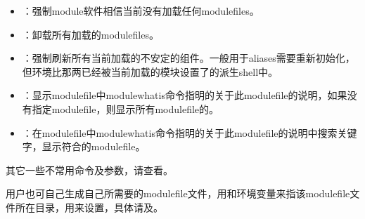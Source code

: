 \documentclass[a4paper,12pt,english]{sphinxmanual}
\begin{document}
\begin{itemize}
\begin{itemize}
\item {} 
\sphinxAtStartPar
prepend\sphinxhyphen{}path：表示将对应目录加到对应环境变量的前面。

\end{itemize}

\item {} 
\sphinxAtStartPar
{}：强制module软件相信当前没有加载任何modulefiles。

\item {} 
\sphinxAtStartPar
{}：卸载所有加载的modulefiles。

\item {} 
\sphinxAtStartPar
{}：强制刷新所有当前加载的不安定的组件。一般用于aliases需要重新初始化，但环境比那两已经被当前加载的模块设置了的派生shell中。

\item {} 
\sphinxAtStartPar
{}：显示modulefile中module\sphinxhyphen{}whatis命令指明的关于此modulefile的说明，如果没有指定modulefile，则显示所有modulefile的。

\item {} 
\sphinxAtStartPar
{}：在modulefile中module\sphinxhyphen{}whatis命令指明的关于此modulefile的说明中搜索关键字，显示符合的modulefile。

\end{itemize}

\sphinxAtStartPar
其它一些不常用命令及参数，请查看。

\sphinxAtStartPar
用户也可自己生成自己所需要的modulefile文件，用和环境变量来指该modulefile文件所在目录，用来设置，具体请及。

\sphinxstepscope
\end{document}
